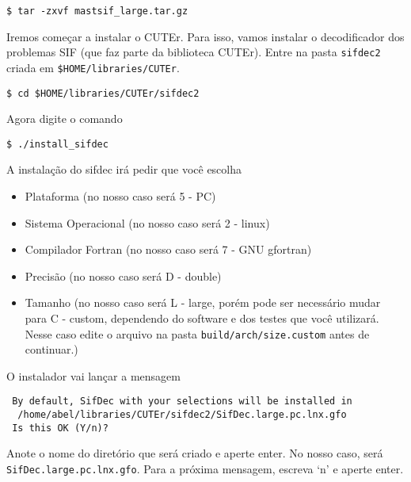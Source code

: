 \documentclass[letterpaper,11pt]{article}
\numberwithin{equation}{section}
\begin{document}
\begin{verbatim}
$ tar -zxvf mastsif_large.tar.gz
\end{verbatim}
Iremos começar a instalar o CUTEr. Para isso, vamos instalar o decodificador
dos problemas SIF (que faz parte da biblioteca CUTEr).
Entre na pasta \verb+sifdec2+ criada em \verb+$HOME/libraries/CUTEr+.
\begin{verbatim}
$ cd $HOME/libraries/CUTEr/sifdec2
\end{verbatim}
Agora digite o comando
\begin{verbatim}
$ ./install_sifdec
\end{verbatim}
A instalação do sifdec irá pedir que você escolha
\begin{itemize}
 \item Plataforma (no nosso caso será 5 - PC)
 \item Sistema Operacional (no nosso caso será 2 - linux)
 \item Compilador Fortran (no nosso caso será 7 - GNU gfortran)
 \item Precisão (no nosso caso será D - double)
 \item Tamanho (no nosso caso será L - large, porém pode ser necessário mudar para C - custom,
dependendo do software e dos testes que você utilizará. Nesse caso edite o arquivo na pasta
\verb+build/arch/size.custom+ antes de continuar.)
\end{itemize}
O instalador vai lançar a mensagem
\begin{verbatim}
 By default, SifDec with your selections will be installed in
  /home/abel/libraries/CUTEr/sifdec2/SifDec.large.pc.lnx.gfo
 Is this OK (Y/n)?
\end{verbatim}
Anote o nome do diretório que será criado e aperte enter. No nosso caso, será \\
 \verb+SifDec.large.pc.lnx.gfo+. Para a próxima mensagem, escreva `n' e aperte enter.
\end{document}
